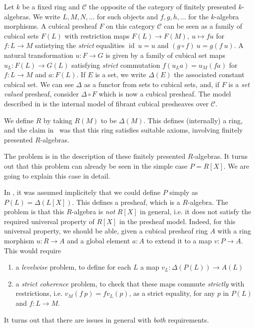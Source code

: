 \documentclass[10pt,a4paper]{article}
\theoremstyle{definition}
\theoremstyle{remark}
\newcommand{\CC}{\mathcal{C}}
\DeclareMathOperator\id{id}
\begin{document}
Let $k$ be a fixed ring and $\CC$ the opposite of the category
of finitely presented $k$-algebras. 
We write $L,M,N,\dots$ for such objects and $f,g,h,\dots$ for the $k$-algebra morphisms.
A cubical presheaf $F$ on this category $\CC$
can be seen as a family of cubical sets $F(L)$ with restriction maps $F(L)\rightarrow F(M),~u\mapsto fu$ for $f:L\rightarrow M$ satistying the
{\em strict} equalities $\id~u= u$ and $(g\circ f)~u = g(f~u)$. A natural transformation $u:F\rightarrow G$ is given by a family of
cubical set maps $u_L:F(L)\rightarrow G(L)$ satisfying {\em strict} commutation $f(u_La) = u_M(f a)$ for $f:L\rightarrow M$ and $a:F(L)$.
If $E$ is a set, we write $\Delta(E)$ the associated constant cubical set.
We can see $\Delta$ as a functor from sets to cubical sets, and, if $F$ is a {\em set valued} presheaf, consider $\Delta\circ F$ which is now
a cubical presheaf.
The model described in \cite{draft} is the internal model of fibrant cubical presheaves \cite{draft,CRS21} over $\CC$.

We define $R$ by taking $R(M)$ to be $\Delta(M)$. This defines (internally) a ring, and the claim in~\cite{draft}
was that this ring satisfies suitable axioms, involving finitely presented $R$-algebras.

The problem is in the description of these
finitely presented $R$-algebras. It turns out that this problem can already be seen in the simple case $P = R[X]$.
We are  going to explain this case in detail.

In \cite{draft}, it was assumed implicitely that we could define $P$ simply as $P(L) = \Delta (L[X])$. This defines a presheaf,
which is a $R$-algebra. 
The problem is that this
$R$-algebra is {\em not} $R[X]$ in general, i.e. it does not satisfy the required universal property of $R[X]$ in the presheaf model.
Indeed, for this universal property, we should be able, given a cubical presheaf ring
$A$ with a ring morphism $u:R\rightarrow A$ and a global element $a:A$ to extend it to a map $v:P\rightarrow A$. This would require
\begin{enumerate}
\item a {\em levelwise} problem, to define for each $L$ a map $v_L:\Delta (P(L))\rightarrow A(L)$
\item a {\em strict coherence} problem, to check that these maps commute {\em strictly} with restrictions, i.e. $v_M(f~p) = f v_L(p)$, as a
  strict equality, for any $p$ in $P(L)$ and $f:L\rightarrow M$.
\end{enumerate}
It turns out that there are issues in general with {\em both} requirements.
\end{document}
